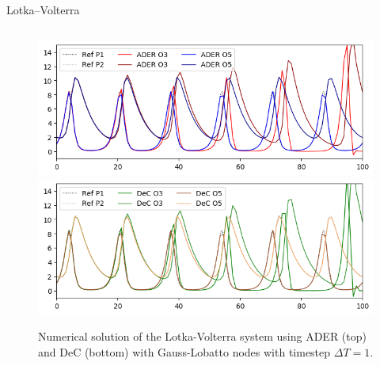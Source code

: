 \documentclass[aspectratio=169]{beamer}
\begin{document}
\begin{frame}{Lotka--Volterra}
\begin{figure}
	\begin{columns}
\includegraphics[width=0.95\linewidth]{n100_ader.png}
\includegraphics[width=0.95\linewidth]{n100_dec.png}
\caption{Numerical solution of the Lotka-Volterra system using ADER (top) and DeC (bottom) with Gauss-Lobatto nodes with timestep $\Delta T = 1$. \label{fig:lodka-sol-dec}}
\end{columns}
\end{figure}

\end{frame}
\end{document}
